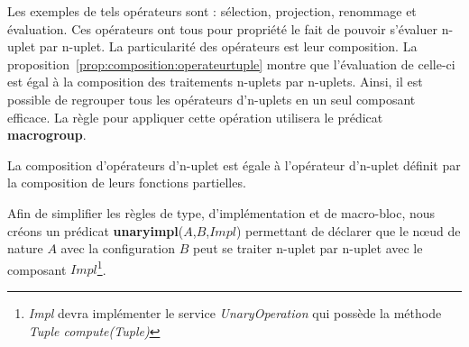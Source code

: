 Les exemples de tels opérateurs sont : sélection, projection, renommage et évaluation. Ces opérateurs ont tous pour propriété le fait de pouvoir s'évaluer n-uplet par n-uplet. La particularité des opérateurs est leur composition. La proposition~\ref{prop:composition:operateurtuple} montre que l'évaluation de celle-ci est égal à la composition des traitements n-uplets par n-uplets. Ainsi, il est possible de regrouper tous les opérateurs d'n-uplets en un seul composant efficace. La règle pour appliquer cette opération utilisera le prédicat \textbf{macrogroup}.
\begin{prop}\label{prop:composition:operateurtuple}
    La composition d'opérateurs d'n-uplet est égale à l'opérateur d'n-uplet définit par la composition de leurs fonctions partielles.
\end{prop}

Afin de simplifier les règles de type, d'implémentation et de macro-bloc, nous créons un prédicat \textbf{unaryimpl}($A$,$B$,$Impl$) permettant de déclarer que le nœud de nature $A$ avec la configuration $B$ peut se traiter n-uplet par n-uplet avec le composant $Impl$\footnote{\textit{Impl} devra implémenter le service \textit{UnaryOperation} qui possède la méthode \textit{Tuple compute(Tuple)}}.


